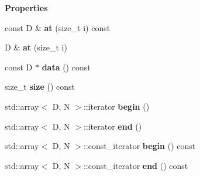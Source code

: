 \begin{Indent}\textbf{ Properties}\par
\begin{DoxyCompactItemize}
\item 
\mbox{\label{classrev_1_1_vector_adb42a9546f5e1af88ec160e8e64ed4ab}} 
const D \& {\bfseries at} (size\+\_\+t i) const
\item 
\mbox{\label{classrev_1_1_vector_a51f80b2f78c25dfa5ba61c1a5a25a46c}} 
D \& {\bfseries at} (size\+\_\+t i)
\item 
\mbox{\label{classrev_1_1_vector_adb34684971d538e02b6c4a436f1e4c96}} 
const D $\ast$ {\bfseries data} () const
\item 
\mbox{\label{classrev_1_1_vector_a56d079f883170ad18e9d84b6010b6dca}} 
size\+\_\+t {\bfseries size} () const
\item 
\mbox{\label{classrev_1_1_vector_abfa33d45b73766120c8fd457ab2e31da}} 
std\+::array$<$ D, N $>$\+::iterator {\bfseries begin} ()
\item 
\mbox{\label{classrev_1_1_vector_a691649ab8c6aa109750937a43cd1812c}} 
std\+::array$<$ D, N $>$\+::iterator {\bfseries end} ()
\item 
\mbox{\label{classrev_1_1_vector_a924ba3d1a9f24730dbf785ecf93b0d6c}} 
std\+::array$<$ D, N $>$\+::const\+\_\+iterator {\bfseries begin} () const
\item 
\mbox{\label{classrev_1_1_vector_a3384b447ffae2f523b2d748cdf0423c2}} 
std\+::array$<$ D, N $>$\+::const\+\_\+iterator {\bfseries end} () const
\end{DoxyCompactItemize}
\end{Indent}
